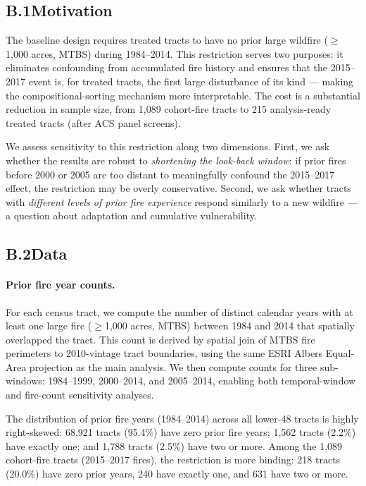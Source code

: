 \documentclass[12pt]{article}
\begin{document}
\subsection*{B.1\quad Motivation}

The baseline design requires treated tracts to have no prior large wildfire
($\geq$1,000 acres, MTBS) during 1984--2014.
This restriction serves two purposes: it eliminates confounding from accumulated fire
history and ensures that the 2015--2017 event is, for treated tracts, the first
large disturbance of its kind --- making the compositional-sorting mechanism
more interpretable.
The cost is a substantial reduction in sample size, from 1,089 cohort-fire tracts
to 215 analysis-ready treated tracts (after ACS panel screens).

We assess sensitivity to this restriction along two dimensions.
First, we ask whether the results are robust to \emph{shortening the look-back window}:
if prior fires before 2000 or 2005 are too distant to meaningfully confound the
2015--2017 effect, the restriction may be overly conservative.
Second, we ask whether tracts with \emph{different levels of prior fire experience}
respond similarly to a new wildfire --- a question about adaptation and
cumulative vulnerability.

\subsection*{B.2\quad Data}

\paragraph{Prior fire year counts.}
For each census tract, we compute the number of distinct calendar years with at
least one large fire ($\geq$1,000 acres, MTBS) between 1984 and 2014 that
spatially overlapped the tract.
This count is derived by spatial join of MTBS fire perimeters to 2010-vintage
tract boundaries, using the same ESRI Albers Equal-Area projection as the
main analysis.
We then compute counts for three sub-windows: 1984--1999, 2000--2014, and 2005--2014,
enabling both temporal-window and fire-count sensitivity analyses.

The distribution of prior fire years (1984--2014) across all lower-48 tracts is
highly right-skewed: 68,921 tracts (95.4\%) have zero prior fire years;
1,562 tracts (2.2\%) have exactly one; and 1,788 tracts (2.5\%) have two or more.
Among the 1,089 cohort-fire tracts (2015--2017 fires), the restriction is more
binding: 218 tracts (20.0\%) have zero prior years, 240 have exactly one, and
631 have two or more.
\end{document}
